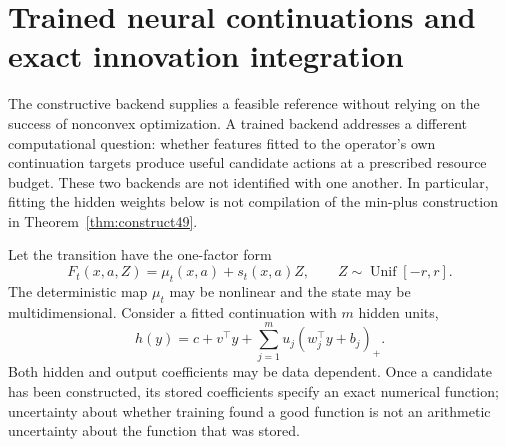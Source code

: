 \section{Trained neural continuations and exact innovation integration}\label{sec:learned56}
The constructive backend supplies a feasible reference without relying on the success of nonconvex optimization. A trained backend addresses a different computational question: whether features fitted to the operator's own continuation targets produce useful candidate actions at a prescribed resource budget. These two backends are not identified with one another. In particular, fitting the hidden weights below is not compilation of the min-plus construction in Theorem~\ref{thm:construct49}.

Let the transition have the one-factor form
\[
 F_t(x,a,Z)=\mu_t(x,a)+s_t(x,a)Z,\qquad
 Z\sim\operatorname{Unif}[-r,r].
\]
The deterministic map $\mu_t$ may be nonlinear and the state may be multidimensional. Consider a fitted continuation with $m$ hidden units,
\begin{equation}\label{eq:trained56}
 h(y)=c+v^\top y+\sum_{j=1}^m u_j(w_j^\top y+b_j)_+.
\end{equation}
Both hidden and output coefficients may be data dependent. Once a candidate has been constructed, its stored coefficients specify an exact numerical function; uncertainty about whether training found a good function is not an arithmetic uncertainty about the function that was stored.

